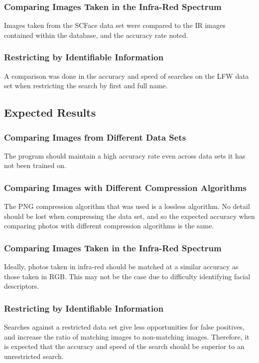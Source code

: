 \documentclass[12pt]{article}
\begin{document}
\subsubsection{Comparing Images Taken in the Infra-Red Spectrum}
Images taken from the SCFace data set were compared to the IR images contained within the database, and the accuracy rate noted.

\subsubsection{Restricting by Identifiable Information}
A comparison was done in the accuracy and speed of searches on the LFW data set when restricting the search by first and full name.

\subsection{Expected Results}
\subsubsection{Comparing Images from Different Data Sets}
The program should maintain a high accuracy rate even across data sets it has not been trained on.

\subsubsection{Comparing Images with Different Compression Algorithms}
The PNG compression algorithm that was used is a lossless algorithm. No detail should be lost when compressing the data set, and so the expected accuracy when comparing photos with different compression algorithms is the same.

\subsubsection{Comparing Images Taken in the Infra-Red Spectrum}
Ideally, photos taken in infra-red should be matched at a similar accuracy as those taken in RGB. This may not be the case due to difficulty identifying facial descriptors.

\subsubsection{Restricting by Identifiable Information}
Searches against a restricted data set give less opportunities for false positives, and increase the ratio of matching images to non-matching images. Therefore, it is expected that the accuracy and speed of the search should be superior to an unrestricted search.
\end{document}
